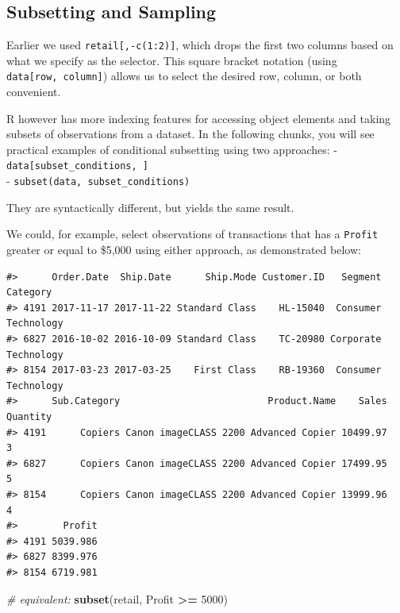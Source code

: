 \documentclass[]{article}
\newenvironment{Shaded}{\begin{snugshade}}{\end{snugshade}}
\newcommand{\CommentTok}[1]{\textcolor[rgb]{0.56,0.35,0.01}{\textit{#1}}}
\newcommand{\DecValTok}[1]{\textcolor[rgb]{0.00,0.00,0.81}{#1}}
\newcommand{\KeywordTok}[1]{\textcolor[rgb]{0.13,0.29,0.53}{\textbf{#1}}}
\newcommand{\NormalTok}[1]{#1}
\newcommand{\OperatorTok}[1]{\textcolor[rgb]{0.81,0.36,0.00}{\textbf{#1}}}
\newcommand{\StringTok}[1]{\textcolor[rgb]{0.31,0.60,0.02}{#1}}
\begin{document}
\hypertarget{subsetting-and-sampling}{%
\subsection{Subsetting and Sampling}\label{subsetting-and-sampling}}

Earlier we used \texttt{retail{[},-c(1:2){]}}, which drops the first two
columns based on what we specify as the selector. This square bracket
notation (using \texttt{data{[}row,\ column{]}}) allows us to select the
desired row, column, or both convenient.

R however has more indexing features for accessing object elements and
taking subsets of observations from a dataset. In the following chunks,
you will see practical examples of conditional subsetting using two
approaches: - \texttt{data{[}subset\_conditions,\ {]}}\\
- \texttt{subset(data,\ subset\_conditions)}

They are syntactically different, but yields the same result.

We could, for example, select observations of transactions that has a
\texttt{Profit} greater or equal to \$5,000 using either approach, as
demonstrated below:

\begin{Shaded}
\end{Shaded}

\begin{verbatim}
#>      Order.Date  Ship.Date      Ship.Mode Customer.ID   Segment   Category
#> 4191 2017-11-17 2017-11-22 Standard Class    HL-15040  Consumer Technology
#> 6827 2016-10-02 2016-10-09 Standard Class    TC-20980 Corporate Technology
#> 8154 2017-03-23 2017-03-25    First Class    RB-19360  Consumer Technology
#>      Sub.Category                          Product.Name    Sales Quantity
#> 4191      Copiers Canon imageCLASS 2200 Advanced Copier 10499.97        3
#> 6827      Copiers Canon imageCLASS 2200 Advanced Copier 17499.95        5
#> 8154      Copiers Canon imageCLASS 2200 Advanced Copier 13999.96        4
#>        Profit
#> 4191 5039.986
#> 6827 8399.976
#> 8154 6719.981
\end{verbatim}

\begin{Shaded}
\begin{Highlighting}[]
\CommentTok{# equivalent:}
\KeywordTok{subset}\NormalTok{(retail, Profit }\OperatorTok{>=}\StringTok{ }\DecValTok{5000}\NormalTok{)}
\end{Highlighting}
\end{Shaded}
\end{document}
